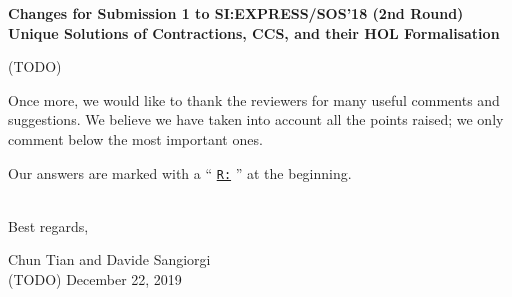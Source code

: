 \newcommand{\Mark}{{\underline{\tt R:} }}


\begin{center}
\textbf{
{\small Changes for Submission 1 to SI:EXPRESS/SOS'18 (2nd Round)}\\[5mm]
{\large Unique Solutions of Contractions, CCS, and their HOL
  Formalisation
}}
\end{center}



\vskip 10pt
\noindent

(TODO)

Once more, we would like to thank the reviewers for many useful
 comments and suggestions. %
We believe we have taken into account all 
the points raised; we only comment below the most
important ones.





Our answers are marked  with a `` \Mark''  at the beginning.

\ \\

Best regards,
\begin{flushright}
  Chun Tian and Davide Sangiorgi \\
  (TODO) December 22, 2019
\end{flushright}



